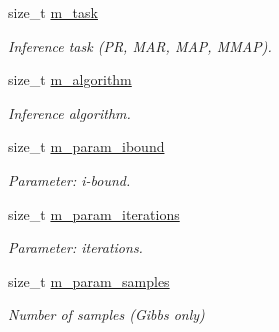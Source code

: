 \begin{DoxyCompactItemize}
\item 
\hypertarget{classMerlin_a1f101237949cd820ad049a23c1871262}{}size\+\_\+t \hyperlink{classMerlin_a1f101237949cd820ad049a23c1871262}{m\+\_\+task}\label{classMerlin_a1f101237949cd820ad049a23c1871262}

\begin{DoxyCompactList}\small\item\em Inference task (P\+R, M\+A\+R, M\+A\+P, M\+M\+A\+P). \end{DoxyCompactList}\item 
\hypertarget{classMerlin_aca9d5d58864094ceeaee0878713de0c6}{}size\+\_\+t \hyperlink{classMerlin_aca9d5d58864094ceeaee0878713de0c6}{m\+\_\+algorithm}\label{classMerlin_aca9d5d58864094ceeaee0878713de0c6}

\begin{DoxyCompactList}\small\item\em Inference algorithm. \end{DoxyCompactList}\item 
\hypertarget{classMerlin_aefe5e3a4b1501b25614bf93023367e4f}{}size\+\_\+t \hyperlink{classMerlin_aefe5e3a4b1501b25614bf93023367e4f}{m\+\_\+param\+\_\+ibound}\label{classMerlin_aefe5e3a4b1501b25614bf93023367e4f}

\begin{DoxyCompactList}\small\item\em Parameter\+: i-\/bound. \end{DoxyCompactList}\item 
\hypertarget{classMerlin_a0a94b7f517db3842b43bf5683fa22c03}{}size\+\_\+t \hyperlink{classMerlin_a0a94b7f517db3842b43bf5683fa22c03}{m\+\_\+param\+\_\+iterations}\label{classMerlin_a0a94b7f517db3842b43bf5683fa22c03}

\begin{DoxyCompactList}\small\item\em Parameter\+: iterations. \end{DoxyCompactList}\item 
\hypertarget{classMerlin_a3a7b5f0168bf2ad8af6c69e47f239415}{}size\+\_\+t \hyperlink{classMerlin_a3a7b5f0168bf2ad8af6c69e47f239415}{m\+\_\+param\+\_\+samples}\label{classMerlin_a3a7b5f0168bf2ad8af6c69e47f239415}

\begin{DoxyCompactList}\small\item\em Number of samples (Gibbs only) \end{DoxyCompactList}\end{DoxyCompactItemize}



